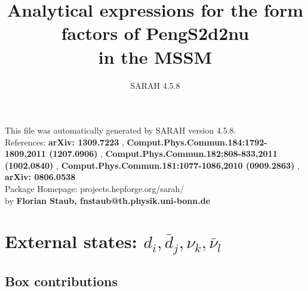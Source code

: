 \documentclass[A4,landscape]{article}
\begin{document}
\title{Analytical expressions for the form factors of PengS2d2nu\\ in the MSSM } 
 \author{SARAH 4.5.8} 
 \maketitle 
 \vspace{10cm} 
This file was automatically generated by SARAH version 4.5.8.  \\ 
References: {\bf arXiv: 1309.7223 }, {\bf Comput.Phys.Commun.184:1792-1809,2011 (1207.0906) }, {\bf Comput.Phys.Commun.182:808-833,2011 (1002.0840) }, {\bf Comput.Phys.Commun.181:1077-1086,2010 (0909.2863) }, {\bf arXiv: 0806.0538 } \\ 
Package Homepage: projects.hepforge.org/sarah/ \\ 
by {\bf Florian Staub, fnstaub@th.physik.uni-bonn.de} 
 \pagebreak 
 \tableofcontents 
 \pagebreak 
\section{External states: ${d_{{i}}, \bar{d}_{{j}}, \nu_{{k}}, \bar{\nu}_{{l}}}$} 
\subsection{Box contributions} 
\end{document}
